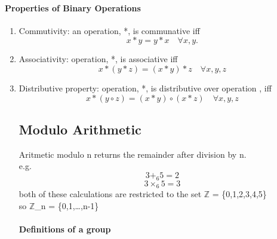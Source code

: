\documentclass[a4paper]{article}
\begin{document}
\paragraph{Properties of Binary Operations}\mbox{}
\begin{enumerate}
\item
  Commutivity: an operation, *, is communative iff
  \Large
  \[ x * y = y * x \quad \forall x,y. \]
  \normalsize
\item
  Associativity: operation, *, is associative iff
  \Large
  \[ x*(y*z) = (x*y)*z \quad \forall x,y,z \]
  \normalsize
\item
  Distributive property: operation, *, is distributive over operation \circ, iff \[\]
  \Large
  \[ x*(y\circ z) = (x * y)\circ(x * z) \quad \forall x,y,z \]
  \normalsize

\subsection{Modulo Arithmetic}

Aritmetic modulo n returns the remainder after division by n. \\
e.g.
\Large
\[ 3 +_6 5 = 2 \]
\[ 3 \times_6 5 = 3 \]
\normalsize
both of these calculations are restricted to the set $\mathbb{Z}$ = \{0,1,2,3,4,5\} \\
so $\mathbb{Z}$_n = \{0,1,\dots,n-1\}

\paragraph{Definitions of a group}\mbox{}\\ \\

\end{enumerate}
\end{document}
